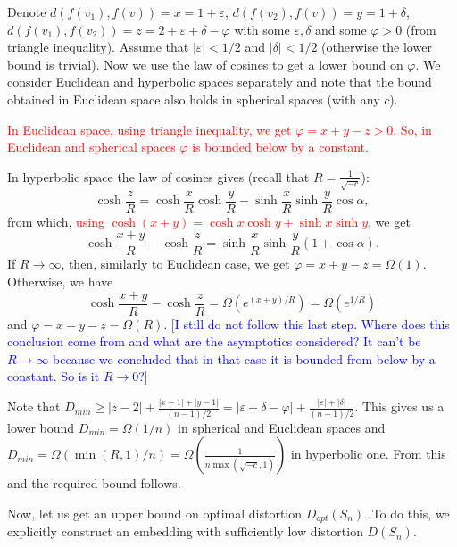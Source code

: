 \documentclass{article} %
\newcommand{\ph}[1]{\textcolor{blue}{#1}}
\newcommand{\lt}[1]{\textcolor{red}{#1}}
\begin{document}
Denote $d(f(v_1),f(v)) = x = 1 + \varepsilon$, $d(f(v_2),f(v)) = y = 1 + \delta$, $d(f(v_1),f(v_2)) = z = 2 + \varepsilon + \delta - \varphi$ with some $\varepsilon, \delta$ and some $\varphi > 0$ (from triangle inequality). Assume that $|\varepsilon| < 1/2$ and $|\delta| < 1/2$ (otherwise the lower bound is trivial). Now we use the law of cosines to get a lower bound on $\varphi$.
We consider Euclidean and hyperbolic spaces separately and note that the bound obtained in Euclidean space also holds in spherical spaces (with any $c$).

\textcolor{red}{In Euclidean space, using triangle inequality, we get  $\varphi = x + y - z > 0$. So, in Euclidean and spherical spaces $\varphi$ is bounded below by a constant.}

In hyperbolic space the law of cosines gives 
(recall that $R = \frac{1}{\sqrt{-c}}$):
\[
\cosh \frac{z}{R} = \cosh \frac{x}{R} \cosh \frac{y}{R} - \sinh \frac{x}{R} \sinh \frac{y}{R} \cos \alpha,
\]
from which, \lt{using $\cosh(x+y) =\cosh x\cosh y+\sinh x\sinh y$}, we get 
\[
\cosh \frac{x+y}{R} - \cosh \frac{z}{R} = \sinh \frac{x}{R} \sinh \frac{y}{R} (1 + \cos \alpha). %
\]
If $R \to \infty$, then, similarly to Euclidean case, we get $\varphi = x + y - z = \Omega(1)$. Otherwise, we have
\[
\cosh \frac{x+y}{R} - \cosh \frac{z}{R} = \Omega\left(e^{(x+y)/R}\right) = \Omega\left(e^{1/R}\right)
\]
and
$\varphi = x + y - z = \Omega(R)$. \ph{[I still do not follow this last step. Where does this conclusion come from and what are the asymptotics considered? It can't be $R \to \infty$ because we concluded that in that case it is bounded from below by a constant. So is it $R \to 0$?]}

Note that $D_{min} \ge |z-2| + \frac{|x-1| + |y-1|}{(n-1)/2} =  |\varepsilon + \delta - \varphi| + \frac{|\varepsilon| + |\delta|}{(n-1)/2}$. This gives us a lower bound $D_{min} = \Omega(1/n)$ in spherical and Euclidean spaces and $D_{min} = \Omega(\min(R,1)/n) = \Omega\left(\frac{1}{n\max\left(\sqrt{-c},1\right)}\right)$ in hyperbolic one. From this and  the required bound follows.

Now, let us get an upper bound on optimal distortion $D_{opt}(S_n)$. To do this, we explicitly construct an embedding with sufficiently low distortion $D(S_n)$.
\end{document}
